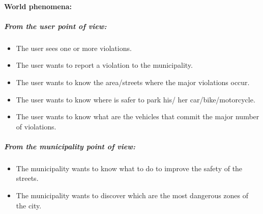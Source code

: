 \documentclass[titlepage]{article}
\begin{document}
\paragraph{World phenomena: }
\subparagraph{From the user point of view: }
\begin{itemize}	
	\item The user sees one or more violations.
	\item The user wants to report a violation to the 					  municipality.
	\item The user wants to know the area/streets where the 
	     major violations occur.
	\item The user wants to know where is safer to park his/			  her car/bike/motorcycle.
	\item The user wants to know what are the vehicles that       		  commit the major number of violations.

\end{itemize}
\subparagraph{From the municipality point of view: }

\begin{itemize}
	\item The municipality wants to know what to do to 				improve the safety of the streets.
	\item The municipality wants to discover which are the most
	dangerous zones of the city.\\
\end{itemize}
 
\end{document}
